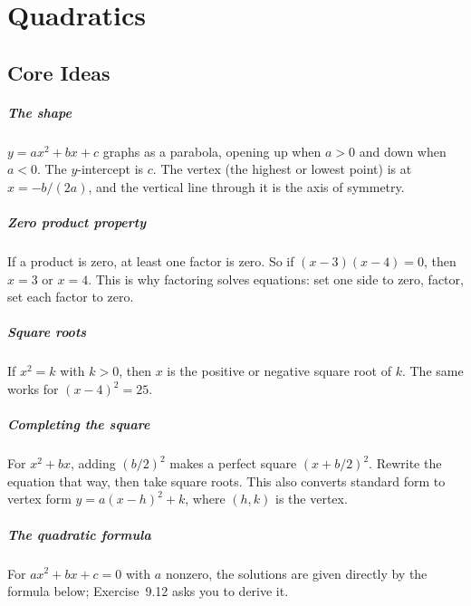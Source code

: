 \chapter{Quadratics}


\section{Core Ideas}

\paragraph{The shape} $y = ax^2 + bx + c$ graphs as a parabola, opening up when $a > 0$ and down when $a < 0$. The $y$-intercept is $c$. The vertex (the highest or lowest point) is at $x = -b/(2a)$, and the vertical line through it is the axis of symmetry.

\paragraph{Zero product property} If a product is zero, at least one factor is zero. So if $(x - 3)(x - 4) = 0$, then $x = 3$ or $x = 4$. This is why factoring solves equations: set one side to zero, factor, set each factor to zero.

\paragraph{Square roots} If $x^2 = k$ with $k > 0$, then $x$ is the positive or negative square root of $k$. The same works for $(x - 4)^2 = 25$.

\paragraph{Completing the square} For $x^2 + bx$, adding $(b/2)^2$ makes a perfect square $(x + b/2)^2$. Rewrite the equation that way, then take square roots. This also converts standard form to vertex form $y = a(x - h)^2 + k$, where $(h, k)$ is the vertex.

\paragraph{The quadratic formula} For $ax^2 + bx + c = 0$ with $a$ nonzero, the solutions are given directly by the formula below; Exercise~9.12 asks you to derive it.

